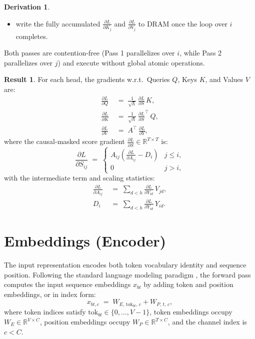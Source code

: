 \documentclass[letterpaper, 10 pt, conference]{ieeeconf}
\newcommand{\R}{\mathbb{R}}
\newcommand{\pdv}[2]{\frac{\partial #1}{\partial #2}}
\newcommand{\dL}[1]{\pdv{L}{#1}}
\theoremstyle{definition}
\newtheorem*{derivation}{Derivation}
\newtheorem*{result}{Result}
\begin{document}
\begin{derivation}
\begin{enumerate}
\begin{itemize}
\begin{align}
                    \dL{K_j} \;\mathrel{+} & =\; \frac{1}{\sqrt{h}}\,\dL{S_{ij}}^{\top}\,Q_i.
                  \end{align}
            \item write the fully accumulated $\dL{K_j}$ and $\dL{V_j}$ to DRAM once the loop over $i$ completes.
          \end{itemize}
  \end{enumerate}
  Both passes are contention-free (Pass 1 parallelizes over $i$, while Pass 2 parallelizes over $j$) and execute without global atomic operations.
\end{derivation}

\begin{result}
  For each head, the gradients w.r.t.\ Queries $Q$, Keys $K$, and Values $V$ are:
  \begin{align}
    \dL{Q} \; & =\; \frac{1}{\sqrt{h}}\,\dL{S}\,K,        \\
    \dL{K} \; & =\; \frac{1}{\sqrt{h}}\,\dL{S}^{\top}\,Q, \\
    \dL{V} \; & =\; A^{\top}\,\dL{Y},
  \end{align}
  where the causal-masked score gradient $\dL{S} \in \R^{T \times T}$ is:
  \begin{equation}
    \dL{S_{ij}} \;=\; \begin{cases}
      A_{ij} \left( \dL{A_{ij}} - D_i \right) & j \leq i, \\
      0                                       & j > i,
    \end{cases}
  \end{equation}
  with the intermediate term and scaling statistics:
  \begin{align}
    \dL{A_{ij}} \; & =\; \sum_{d<h} \dL{Y_{id}}\,V_{jd}, \\
    D_i \;         & =\; \sum_{d<h} \dL{Y_{id}}\,Y_{id}.
  \end{align}
\end{result}

\section{Embeddings (Encoder)}\label{sec:encoder}

The input representation encodes both token vocabulary identity and sequence position. Following the standard language modeling paradigm \cite{embeddings, attention}, the forward pass computes the input sequence embeddings $x_{bt}$ by adding token and position embeddings, or in index form:
\begin{equation}
  x_{bt, c} \;=\; W_{E,\, \mathrm{tok}_{bt},\, c} + W_{P,\, t,\, c},
  \label{eq:enc-fwd}
\end{equation}
where token indices satisfy $\mathrm{tok}_{bt} \in \{0, \dots, V-1\}$, token embeddings occupy $W_E \in \R^{V \times C}$, position embeddings occupy $W_P \in \R^{T \times C}$, and the channel index is $c < C$.
\end{document}
